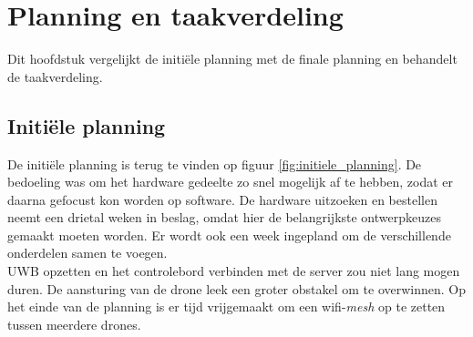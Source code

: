 \chapter{Planning en taakverdeling}
Dit hoofdstuk vergelijkt de initiële planning met de finale planning en behandelt de taakverdeling.

\section{Initi\"ele planning} \label{sec:initiele_planning}
De initi\"ele planning is terug te vinden op figuur \ref{fig:initiele_planning}.
De bedoeling was om het hardware gedeelte zo snel mogelijk af te hebben, zodat er daarna gefocust kon worden op software.
De hardware uitzoeken en bestellen neemt een drietal weken in beslag, omdat hier de belangrijkste ontwerpkeuzes gemaakt moeten worden.
Er wordt ook een week ingepland om de verschillende onderdelen samen te voegen.\\

UWB opzetten en het controlebord verbinden met de server zou niet lang mogen duren.
De aansturing van de drone leek een groter obstakel om te overwinnen.
Op het einde van de planning is er tijd vrijgemaakt om een wifi-\textit{mesh} op te zetten tussen meerdere drones.\\

